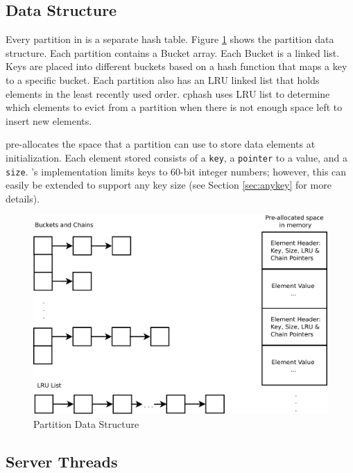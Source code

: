 \subsection{Data Structure}
\label{sec:datastructure}

Every partition in \cphash{} is a separate hash table. Figure
\ref{fig:partition} shows the partition data structure.  Each partition contains
a Bucket array. Each Bucket is a linked list. Keys are placed into different
buckets based on a hash function that maps a key to a specific bucket. Each
partition also has an LRU linked list that holds elements in the least recently
used order.  cphash{} uses LRU list to determine which elements to evict from a
partition when there is not enough space left to insert new elements.

\cphash{} pre-allocates the space that a partition can use to store data
elements at initialization.  Each element stored consists of a \texttt{key}, a
\texttt{pointer} to a value, and a \texttt{size}.  \cphash{}'s implementation
limits keys to 60-bit integer numbers; however, this can easily be extended to
support any key size (see Section \ref{sec:anykey} for more details).

\begin{figure}[t]
  \centering
  \includegraphics[width=\linewidth]{figs/partition.pdf}
  \caption{Partition Data Structure}
  \label{fig:partition}
\end{figure}

\subsection{Server Threads}
\label{sec:serverthreads}

